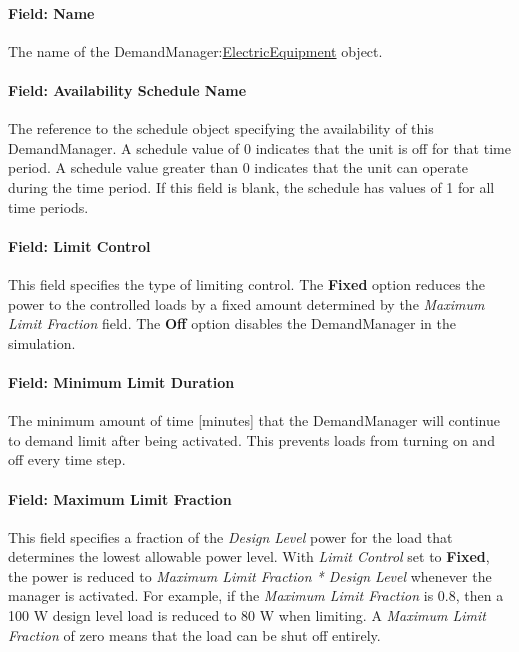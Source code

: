 \paragraph{Field: Name}\label{field-name-3-008}

The name of the DemandManager:\hyperref[electricequipment]{ElectricEquipment} object.

\paragraph{Field: Availability Schedule Name}\label{field-availability-schedule-name-2-000}

The reference to the schedule object specifying the availability of this DemandManager. A schedule value of 0 indicates that the unit is off for that time period. A schedule value greater than 0 indicates that the unit can operate during the time period. If this field is blank, the schedule has values of 1 for all time periods.

\paragraph{Field: Limit Control}\label{field-limit-control-2}

This field specifies the type of limiting control. The \textbf{Fixed} option reduces the power to the controlled loads by a fixed amount determined by the \emph{Maximum Limit Fraction} field. The \textbf{Off} option disables the DemandManager in the simulation.

\paragraph{Field: Minimum Limit Duration}\label{field-minimum-limit-duration-2}

The minimum amount of time {[}minutes{]} that the DemandManager will continue to demand limit after being activated. This prevents loads from turning on and off every time step.

\paragraph{Field: Maximum Limit Fraction}\label{field-maximum-limit-fraction-2}

This field specifies a fraction of the \emph{Design Level} power for the load that determines the lowest allowable power level. With \emph{Limit Control} set to \textbf{Fixed}, the power is reduced to \emph{Maximum Limit Fraction * Design Level} whenever the manager is activated. For example, if the \emph{Maximum Limit Fraction} is 0.8, then a 100 W design level load is reduced to 80 W when limiting. A \emph{Maximum Limit Fraction} of zero means that the load can be shut off entirely.

